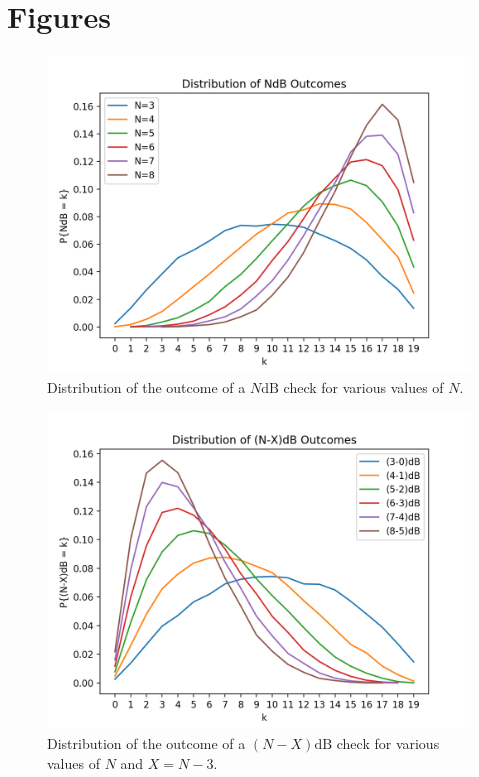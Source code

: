 \documentclass{scrartcl}
\begin{document}
\section{Figures}
\begin{figure}[ht]
\centering
\includegraphics[scale=0.9]{outcome_distributions.png}
\caption{Distribution of the outcome of a $N\text{dB}$ check for various values of $N$.}
\end{figure}

\begin{figure}[ht]
\centering
\includegraphics[scale=0.9]{discard_distributions.png}
\caption{Distribution of the outcome of a $(N-X)\text{dB}$ check for various values of $N$ and $X = N-3$.}
\end{figure}
\end{document}
